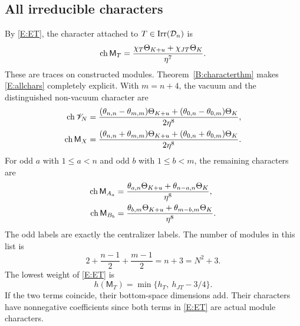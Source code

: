 \documentclass[11pt]{article}
\numberwithin{equation}{section}
\begin{document}
\subsection{All irreducible characters}\label{E:allcharacters}
By \eqref{E:ET}, the character attached to $T\in\operatorname{Irr}(\mathcal D_n)$ is
\begin{equation}\label{E:allchars}
\operatorname{ch}\mathsf M_T
=\frac{\chi_T\Theta_{K+u}+\chi_{JT}\Theta_K}{\eta^7}.
\end{equation}
These are traces on constructed modules. Theorem~\ref{B:characterthm} makes \eqref{E:allchars} completely explicit. With $m=n+4$, the vacuum and the distinguished non-vacuum character are
\begin{align}
\operatorname{ch} \mathscr{V}_N&=
\frac{(\theta_{n,n}-\theta_{m,m})\Theta_{K+u}
+(\theta_{0,n}-\theta_{0,m})\Theta_K}{2\eta^8},\label{E:vacchar}\\
\operatorname{ch}\mathsf M_X&=
\frac{(\theta_{n,n}+\theta_{m,m})\Theta_{K+u}
+(\theta_{0,n}+\theta_{0,m})\Theta_K}{2\eta^8}.\label{E:Xchar}
\end{align}
For odd $a$ with $1\leq a<n$ and odd $b$ with $1\leq b<m$, the remaining characters are
\begin{align}
\operatorname{ch}\mathsf M_{A_a}&=
\frac{\theta_{a,n}\Theta_{K+u}+\theta_{n-a,n}\Theta_K}{\eta^8},\label{E:Achar}\\
\operatorname{ch}\mathsf M_{B_b}&=
\frac{\theta_{b,m}\Theta_{K+u}+\theta_{m-b,m}\Theta_K}{\eta^8}.\label{E:Bchar}
\end{align}
The odd labels are exactly the centralizer labels. The number of modules in this list is
\[
2+\frac{n-1}{2}+\frac{m-1}{2}=n+3=N^2+3.
\]
The lowest weight of \eqref{E:ET} is
\begin{equation}\label{E:lowest}
h(\mathsf M_T)=\min\{h_T,\ h_{JT}-3/4\}.
\end{equation}
If the two terms coincide, their bottom-space dimensions add. Their characters have nonnegative coefficients since both terms in \eqref{E:ET} are actual module characters.
\end{document}
